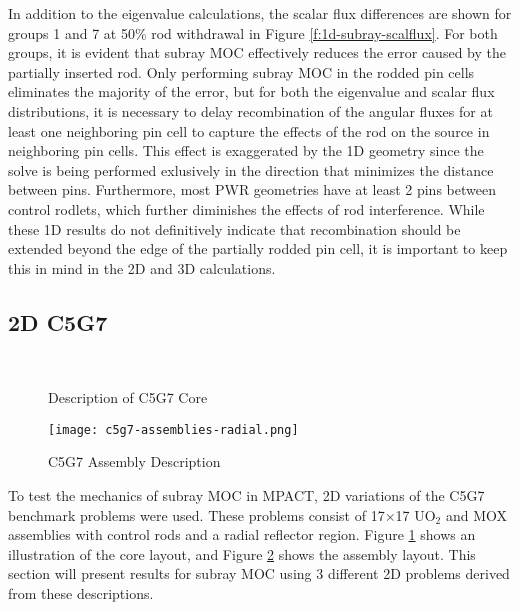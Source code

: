 In addition to the eigenvalue calculations, the scalar flux differences are shown for groups 1 and 7 at 50\% rod withdrawal in Figure \ref{f:1d-subray-scalflux}.  For both groups, it is evident that subray MOC effectively reduces the error caused by the partially inserted rod.  Only performing subray MOC in the rodded pin cells eliminates the majority of the error, but for both the eigenvalue and scalar flux distributions, it is necessary to delay recombination of the angular fluxes for at least one neighboring pin cell to capture the effects of the rod on the source in neighboring pin cells.  This effect is exaggerated by the 1D geometry since the solve is being performed exlusively in the direction that minimizes the distance between pins.  Furthermore, most PWR geometries have at least 2 pins between control rodlets, which further diminishes the effects of rod interference.  While these 1D results do not definitively indicate that recombination should be extended beyond the edge of the partially rodded pin cell, it is important to keep this in mind in the 2D and 3D calculations.

\subsection{2D C5G7}

\begin{figure}[h]
    \centering
    ~
    \caption{Description of C5G7 Core\cite{EELewisC5G7extended2005}}\label{f:c5g7-core}
\end{figure}

\begin{figure}[h]
    \centering
    \texttt{[image: c5g7-assemblies-radial.png]}
    \caption{C5G7 Assembly Description\cite{EELewisC5G7extended2005}}\label{f:c5g7-assemblies}
\end{figure}

To test the mechanics of subray MOC in MPACT, 2D variations of the C5G7 benchmark problems were used.  These problems consist of 17$\times$17 UO$_2$ and MOX assemblies with control rods and a radial reflector region.  Figure \ref{f:c5g7-core} shows an illustration of the core layout, and Figure \ref{f:c5g7-assemblies} shows the assembly layout.  This section will present results for subray MOC using 3 different 2D problems derived from these descriptions.

